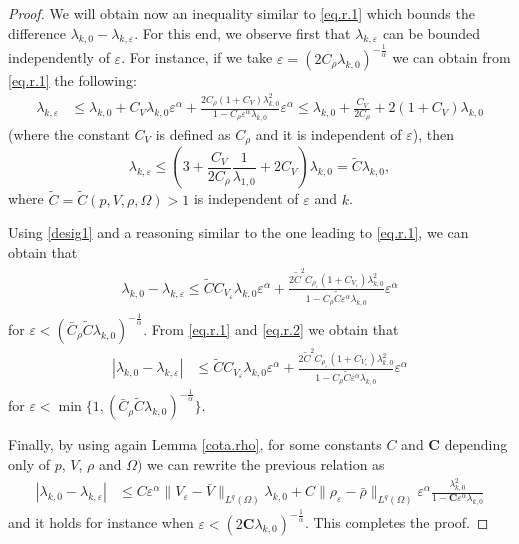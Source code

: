 \documentclass[12pt]{amsart}
\theoremstyle{definition}
\theoremstyle{remark}
\numberwithin{equation}{section}
\begin{document}
\begin{proof}
We will obtain now an inequality similar to \eqref{eq.r.1} which bounds the difference $\lambda_{k,0}-\lambda_{k,\varepsilon}$. For this end, we observe first that   $\lambda_{k,\varepsilon}$ can be bounded independently of $\varepsilon$. For instance, if we take  $\varepsilon=  (2  C_\rho \lambda_{k,0})^{-\frac{1}{\alpha}}$ we can obtain from \eqref{eq.r.1} the following:
\begin{align*}
\lambda_{k,\varepsilon} &\leq \lambda_{k,0} +  C_V \lambda_{k,0}\varepsilon^\alpha + \frac{2C_\rho (1+C_V)\lambda_{k,0}^2}{1-C_\rho \varepsilon^\alpha \lambda_{k,0}}\varepsilon^\alpha\leq \lambda_{k,0} +  \frac{  C_V}{2C_\rho}  +    2 (1+C_V) \lambda_{k,0}
\end{align*}
(where the constant $C_V$ is defined as  $C_\rho$ and it is independent of $\varepsilon$), then
\begin{equation} \label{desig1}
\lambda_{k,\varepsilon} \leq   \left(3+ \frac{ C_V }{2 C_\rho}\frac{1}{\lambda_{1,0}} +2 C_V \right) \lambda_{k,0} = \tilde C \lambda_{k,0},
\end{equation}
where $\tilde C=\tilde C(p,V,\rho,\Omega)>1$ is independent of $\varepsilon$ and $k$.

Using \eqref{desig1} and a reasoning similar to the one leading to  \eqref{eq.r.1}, we can obtain that
\begin{align} \label{eq.r.2}
\begin{split}
\lambda_{k,0}-\lambda_{k,\varepsilon} \leq\tilde C C_{V_\varepsilon} \lambda_{k,0} \varepsilon^\alpha +   \frac{2 \tilde C^2  C_{\rho_\varepsilon} (1+C_{V_\varepsilon}) \lambda_{k,0}^2}{1- C_\rho \tilde C  \varepsilon^\alpha \lambda_{k,0}} \varepsilon^\alpha
\end{split}
\end{align}
for $\varepsilon <(\bar C_\rho \tilde C \lambda_{k,0})^{-\frac{1}{\alpha}}$. From \eqref{eq.r.1} and \eqref{eq.r.2} we obtain that
\begin{align*}
|\lambda_{k,0}-\lambda_{k,\varepsilon}| &\leq  
\tilde C C_{V_\varepsilon} \lambda_{k,0} \varepsilon^\alpha +  \frac{2 \tilde C^2 C_{\rho_\varepsilon} (1+C_{V_\varepsilon}) \lambda_{k,0}^2}{1-C_\rho \tilde C \varepsilon^\alpha \lambda_{k,0}}\varepsilon^\alpha 
\end{align*}
for $\varepsilon < \min\{1,(\bar C_\rho \tilde C \lambda_{k,0})^{-\frac{1}{\alpha}}\}$.

Finally, by using again Lemma \ref{cota.rho}, for some constants $C$ and $\textbf{C}$  depending only of $p$,  $V$, $\rho$ and $\Omega)$ we can rewrite the previous relation as
\begin{align*}
|\lambda_{k,0}-\lambda_{k,\varepsilon}| &\leq  
C  \varepsilon^\alpha \|V_\varepsilon - \bar V\|_{L^q(\Omega)} \lambda_{k,0} + C  \|\rho_\varepsilon - \bar \rho\|_{L^q(\Omega)}  \varepsilon^\alpha \frac{ \lambda_{k,0}^2}{1- \textbf{C} \varepsilon^\alpha \lambda_{k,0}}
\end{align*}
and it holds for instance when $\varepsilon < (2\textbf{C} \lambda_{k,0})^{-\frac{1}{\alpha}}$. This completes the proof.
\end{proof}
\end{document}
